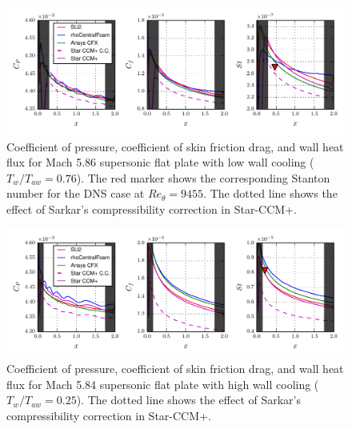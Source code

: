 \documentclass[journal ]{new-aiaa}
\begin{document}
\begin{figure}
\centering
  \includegraphics[width=\textwidth]{figs/Plate_RANS6AD_Cd_new.pdf}
  \caption{Coefficient of pressure, coefficient of skin friction drag, and wall heat flux for Mach 5.86 supersonic flat plate with low wall cooling ($T_w/T_{aw} = 0.76$). The red marker shows the corresponding Stanton number for the DNS case at $Re_\theta = 9455$. The dotted line shows the effect of Sarkar's compressibility correction in Star-CCM+.}
  \label{fig:Plate_RANS6AD_Cd}
\end{figure}

\begin{figure}
\centering
  \includegraphics[width=\textwidth]{figs/Plate_RANS6_Cd_new.pdf}
  \caption{Coefficient of pressure, coefficient of skin friction drag, and wall heat flux for Mach 5.84 supersonic flat plate with high wall cooling ($T_w/T_{aw} = 0.25$). The dotted line shows the effect of Sarkar's compressibility correction in Star-CCM+.}
  \label{fig:Plate_RANS6_Cd}
\end{figure}
\end{document}

